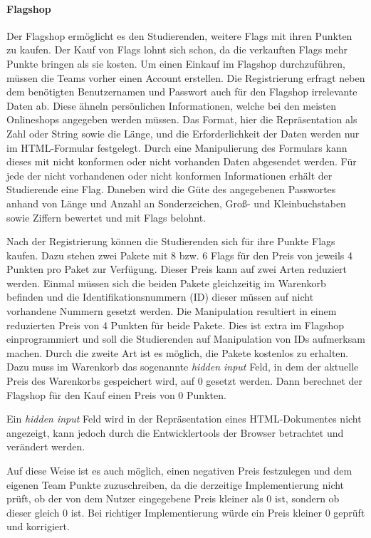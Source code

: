 \paragraph{Flagshop} \label{para:Flagshop}
Der Flagshop ermöglicht es den Studierenden, weitere Flags mit ihren Punkten zu kaufen. Der Kauf von Flags lohnt sich schon, da die verkauften Flags mehr Punkte bringen als sie kosten. Um einen Einkauf im Flagshop durchzuführen, müssen die Teams vorher einen Account erstellen. Die Registrierung erfragt neben dem benötigten Benutzernamen und Passwort auch für den Flagshop irrelevante Daten ab. Diese ähneln persönlichen Informationen, welche bei den meisten Onlineshops angegeben werden müssen. Das Format, hier die Repräsentation als Zahl oder String sowie die Länge, und die Erforderlichkeit der Daten werden nur im HTML-Formular festgelegt. Durch eine Manipulierung des Formulars kann dieses mit nicht konformen oder nicht vorhanden Daten abgesendet werden. Für jede der nicht vorhandenen oder nicht konformen Informationen erhält der Studierende eine Flag. Daneben wird die Güte des angegebenen Passwortes anhand von Länge und Anzahl an Sonderzeichen, Groß- und Kleinbuchstaben sowie Ziffern bewertet und mit Flags belohnt.

Nach der Registrierung können die Studierenden sich für ihre Punkte Flags kaufen. Dazu stehen zwei Pakete mit 8 bzw. 6 Flags für den Preis von jeweils 4 Punkten pro Paket zur Verfügung. Dieser Preis kann auf zwei Arten reduziert werden. 
Einmal müssen sich die beiden Pakete gleichzeitig im Warenkorb befinden und die Identifikationsnummern (ID) dieser müssen auf nicht vorhandene Nummern gesetzt werden. Die Manipulation resultiert in einem reduzierten Preis von 4 Punkten für beide Pakete. Dies ist extra im Flagshop einprogrammiert und soll die Studierenden auf Manipulation von IDs aufmerksam machen.
Durch die zweite Art ist es möglich, die Pakete kostenlos zu erhalten. Dazu muss im Warenkorb das sogenannte \textit{hidden input} Feld, in dem der aktuelle Preis des Warenkorbs gespeichert wird, auf 0 gesetzt werden. Dann berechnet der Flagshop für den Kauf einen Preis von 0 Punkten. \cite[S. 63]{abtsUeberarbeitungUndErweiterung2016}

Ein \textit{hidden input} Feld wird in der Repräsentation eines HTML-Dokumentes nicht angezeigt, kann jedoch durch die Entwicklertools der Browser betrachtet und verändert werden. \cite{w3schoolsHTMLHiddenInput}

Auf diese Weise ist es auch möglich, einen negativen Preis festzulegen und dem eigenen Team Punkte zuzuschreiben, da die derzeitige Implementierung nicht prüft, ob der von dem Nutzer eingegebene Preis kleiner als 0 ist, sondern ob dieser gleich 0 ist. Bei richtiger Implementierung würde ein Preis kleiner 0 geprüft und korrigiert.

